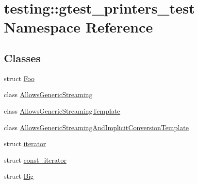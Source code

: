 \hypertarget{namespacetesting_1_1gtest__printers__test}{\section{testing\-:\-:gtest\-\_\-printers\-\_\-test Namespace Reference}
\label{namespacetesting_1_1gtest__printers__test}
}
\subsection*{Classes}
\begin{DoxyCompactItemize}
\item 
struct \hyperlink{structtesting_1_1gtest__printers__test_1_1_foo}{Foo}
\item 
class \hyperlink{classtesting_1_1gtest__printers__test_1_1_allows_generic_streaming}{Allows\-Generic\-Streaming}
\item 
class \hyperlink{classtesting_1_1gtest__printers__test_1_1_allows_generic_streaming_template}{Allows\-Generic\-Streaming\-Template}
\item 
class \hyperlink{classtesting_1_1gtest__printers__test_1_1_allows_generic_streaming_and_implicit_conversion_template}{Allows\-Generic\-Streaming\-And\-Implicit\-Conversion\-Template}
\item 
struct \hyperlink{structtesting_1_1gtest__printers__test_1_1iterator}{iterator}
\item 
struct \hyperlink{structtesting_1_1gtest__printers__test_1_1const__iterator}{const\-\_\-iterator}
\item 
struct \hyperlink{structtesting_1_1gtest__printers__test_1_1_big}{Big}
\end{DoxyCompactItemize}
